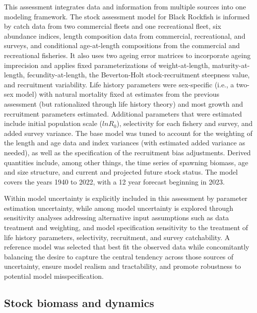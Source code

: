 \documentclass[11pt,
  english,
  letterpaper,
]{article}
\begin{document}
This assessment integrates data and information from multiple sources into one modeling framework. The stock assessment model for Black Rockfish is informed by catch data from two commercial fleets and one recreational fleet, six abundance indices, length composition data from commercial, recreational, and surveys, and conditional age-at-length compositions from the commercial and recreational fisheries. It also uses two ageing error matrices to incorporate ageing imprecision and applies fixed parameterizations of weight-at-length, maturity-at-length, fecundity-at-length, the Beverton-Holt stock-recruitment steepness value, and recruitment variability. Life history parameters were sex-specific (i.e., a two-sex model) with natural mortality fixed at estimates from the previous assessment (but rationalized through life history theory) and most growth and recruitment parameters estimated. Additional parameters that were estimated include initial population scale (\(lnR_0\)), selectivity for each fishery and survey, and added survey variance. The base model was tuned to account for the weighting of the length and age data and index variances (with estimated added variance as needed), as well as the specification of the recruitment bias adjustments. Derived quantities include, among other things, the time series of spawning biomass, age and size structure, and current and projected future stock status. The model covers the years 1940 to 2022, with a 12 year forecast beginning in 2023.

Within model uncertainty is explicitly included in this assessment by parameter estimation uncertainty, while among model uncertainty is explored through sensitivity analyses addressing alternative input assumptions such as data treatment and weighting, and model specification sensitivity to the treatment of life history parameters, selectivity, recruitment, and survey catchability. A reference model was selected that best fit the observed data while concomitantly balancing the desire to capture the central tendency across those sources of uncertainty, ensure model realism and tractability, and promote robustness to potential model misspecification.

\hypertarget{stock-biomass-and-dynamics}{%
\subsection*{Stock biomass and dynamics}\label{stock-biomass-and-dynamics}}
\end{document}
